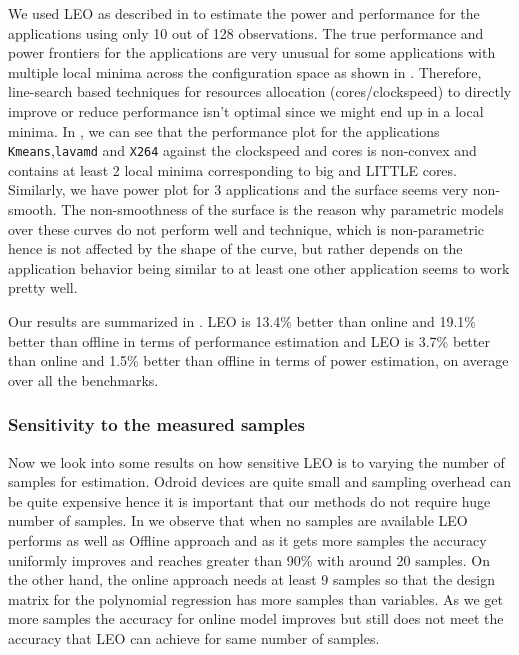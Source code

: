 We used LEO as described in  to estimate the power and performance for the applications using only 10 out of 128 observations. The true performance and power frontiers for the applications are very unusual for some applications with multiple local minima across the configuration space as shown in . Therefore, line-search based techniques for  resources allocation (cores/clockspeed) to directly improve or reduce performance isn't optimal since we might end up in a local minima. In  , we can see that 
the performance plot for the applications \texttt{Kmeans},\texttt{lavamd} and \texttt{X264} 
against the clockspeed and cores is non-convex and contains at least 2 local minima corresponding to big and LITTLE cores. 
Similarly, we have power plot for 3 applications and the surface seems very non-smooth. The non-smoothness of the surface is the reason why parametric models over these curves do not perform well and technique, which is non-parametric hence is not affected by the shape of the curve, but rather depends on the application behavior being similar to at least one other application seems to work pretty well.

Our results are summarized in . LEO is 13.4\% better than online and 19.1\% better than offline in terms of performance estimation and LEO is 3.7\% better than online and 1.5\% better than offline in terms of power estimation, on average over all the benchmarks. %



\subsubsection{Sensitivity to the measured samples}
Now we look into some results on how sensitive LEO is to varying the number of samples for estimation. Odroid devices are quite small and sampling overhead can be quite expensive hence it is important that our methods do not require huge number of samples. In  we observe that when no samples are available LEO performs as well as Offline approach and as it gets more samples the accuracy uniformly improves and reaches greater than 90\% with around 20 samples. On the other hand, the online approach needs at least 9 samples so that the design matrix for the polynomial regression has more samples than variables. As we get more samples the accuracy for online model improves but still does not meet the accuracy that LEO can achieve for same number of samples.

